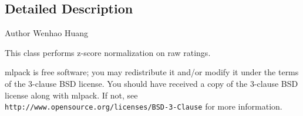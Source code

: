 \subsection{Detailed Description}
\begin{DoxyAuthor}{Author}
Wenhao Huang
\end{DoxyAuthor}
This class performs z-\/score normalization on raw ratings.

mlpack is free software; you may redistribute it and/or modify it under the terms of the 3-\/clause B\+SD license. You should have received a copy of the 3-\/clause B\+SD license along with mlpack. If not, see {\tt http\+://www.\+opensource.\+org/licenses/\+B\+S\+D-\/3-\/\+Clause} for more information. 